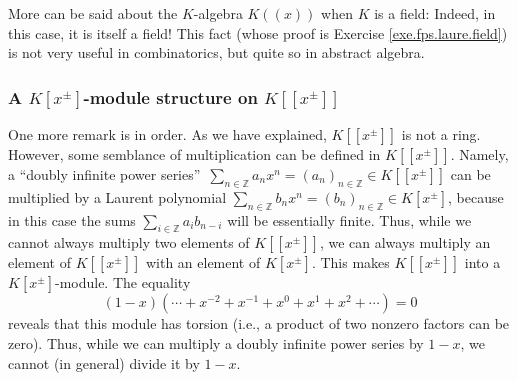 More can be said about the $K$-algebra $K\left(  \left(  x\right)  \right)  $
when $K$ is a field: Indeed, in this case, it is itself a field! This fact
(whose proof is Exercise \ref{exe.fps.laure.field}) is not very useful in
combinatorics, but quite so in abstract algebra.

\subsubsection{A $K\left[  x^{\pm}\right]  $-module structure on $K\left[
\left[  x^{\pm}\right]  \right]  $}

One more remark is in order. As we have explained, $K\left[  \left[  x^{\pm
}\right]  \right]  $ is not a ring. However, some semblance of multiplication
can be defined in $K\left[  \left[  x^{\pm}\right]  \right]  $. Namely, a
\textquotedblleft doubly infinite power series\textquotedblright\ $\sum
_{n\in\mathbb{Z}}a_{n}x^{n}=\left(  a_{n}\right)  _{n\in\mathbb{Z}}\in
K\left[  \left[  x^{\pm}\right]  \right]  $ can be multiplied by a Laurent
polynomial $\sum_{n\in\mathbb{Z}}b_{n}x^{n}=\left(  b_{n}\right)
_{n\in\mathbb{Z}}\in K\left[  x^{\pm}\right]  $, because in this case the sums
$\sum_{i\in\mathbb{Z}}a_{i}b_{n-i}$ will be essentially finite. Thus, while we
cannot always multiply two elements of $K\left[  \left[  x^{\pm}\right]
\right]  $, we can always multiply an element of $K\left[  \left[  x^{\pm
}\right]  \right]  $ with an element of $K\left[  x^{\pm}\right]  $. This
makes $K\left[  \left[  x^{\pm}\right]  \right]  $ into a $K\left[  x^{\pm
}\right]  $-module. The equality%
\[
\left(  1-x\right)  \left(  \cdots+x^{-2}+x^{-1}+x^{0}+x^{1}+x^{2}%
+\cdots\right)  =0
\]
reveals that this module has torsion (i.e., a product of two nonzero factors
can be zero). Thus, while we can multiply a doubly infinite power series by
$1-x$, we cannot (in general) divide it by $1-x$.
